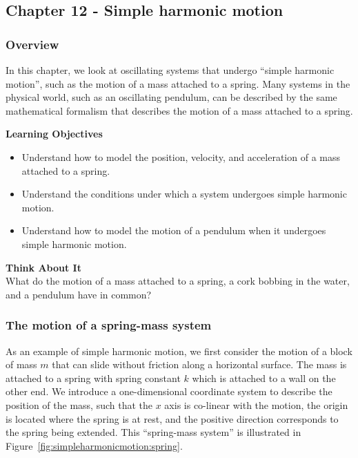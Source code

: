 \subsection{Chapter 12 - Simple harmonic motion}

\subsubsection{Overview}\label{chapter:simpleharmonicmotion}

In this chapter, we look at oscillating systems that undergo ``simple harmonic motion'', such as the motion of a mass attached to a spring. Many systems in the physical world, such as an oscillating pendulum, can be described by the same mathematical formalism that describes the motion of a mass attached to a spring.

\begin{framed}
\textbf{Learning Objectives}\\
\begin{itemize}
\item Understand how to model the position, velocity, and acceleration of a mass attached to a spring.
\item Understand the conditions under which a system undergoes simple harmonic motion.
\item Understand how to model the motion of a pendulum when it undergoes simple harmonic motion.
\end{itemize}
\end{framed}

\begin{framed}
\textbf{Think About It}\\
What do the motion of a mass attached to a spring, a cork bobbing in the water, and a pendulum have in common?
\end{framed}

\subsubsection{The motion of a spring-mass system}

As an example of simple harmonic motion, we first consider the motion of a block of mass $m$ that can slide without friction along a horizontal surface. The mass is attached to a spring with spring constant $k$ which is attached to a wall on the other end. We introduce a one-dimensional coordinate system to describe the position of the mass, such that the $x$ axis is co-linear with the motion, the origin is located where the spring is at rest, and the positive direction corresponds to the spring being extended. This ``spring-mass system'' is illustrated in Figure~\ref{fig:simpleharmonicmotion:spring}.

